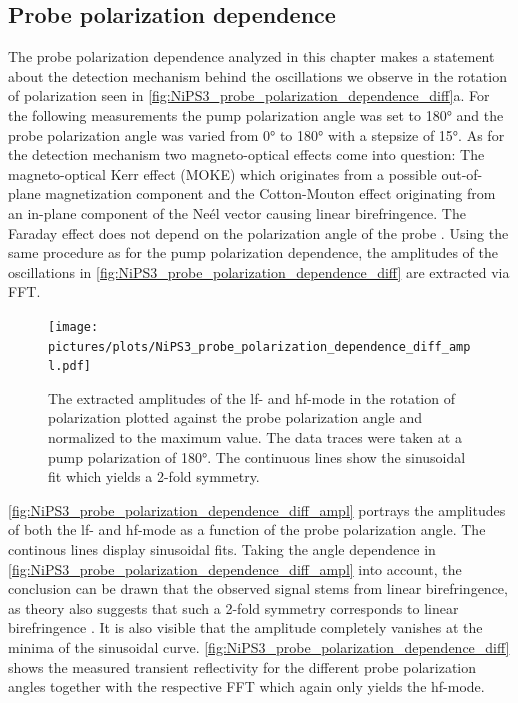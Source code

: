 \subsection{Probe polarization dependence}
The probe polarization dependence analyzed in this chapter makes a statement about the detection mechanism behind the oscillations we observe in the rotation of polarization seen in \autoref{fig:NiPS3_probe_polarization_dependence_diff}a.
For the following measurements the pump polarization angle was set to 180° and the probe polarization angle was varied from 0° to 180° with a stepsize of 15°.
As for the detection mechanism two magneto-optical effects come into question:
The magneto-optical Kerr effect (MOKE) which originates from a possible out-of-plane magnetization component and the Cotton-Mouton effect originating from an in-plane component of the Neél vector causing linear birefringence.
The Faraday effect does not depend on the polarization angle of the probe \cite{toyoda_phase_2023}.
Using the same procedure as for the pump polarization dependence, the amplitudes of the oscillations in \autoref{fig:NiPS3_probe_polarization_dependence_diff} are extracted via FFT.
\begin{figure}[hbt!]
    \centering  
    \texttt{[image: pictures/plots/NiPS3\_probe\_polarization\_dependence\_diff\_ampl.pdf]} \vspace{-0.3cm}
    \caption{The extracted amplitudes of the lf- and hf-mode in the rotation of polarization plotted against the probe polarization angle and normalized to the maximum value. The data traces were taken at a pump polarization of 180°. The continuous lines show the sinusoidal fit which yields a 2-fold symmetry.}
    \label{fig:NiPS3_probe_polarization_dependence_diff_ampl}
\end{figure}
\FloatBarrier
\autoref{fig:NiPS3_probe_polarization_dependence_diff_ampl} portrays the amplitudes of both the lf- and hf-mode as a function of the probe polarization angle.
The continous lines display sinusoidal fits.
Taking the angle dependence in \autoref{fig:NiPS3_probe_polarization_dependence_diff_ampl} into account, the conclusion can be drawn that the observed signal stems from linear birefringence, as theory also suggests that such a 2-fold symmetry corresponds to linear birefringence \cite{satoh_excitation_2017}.
It is also visible that the amplitude completely vanishes at the minima of the sinusoidal curve.
\autoref{fig:NiPS3_probe_polarization_dependence_diff} shows the measured transient reflectivity for the different probe polarization angles together with the respective FFT which again only yields the hf-mode.
